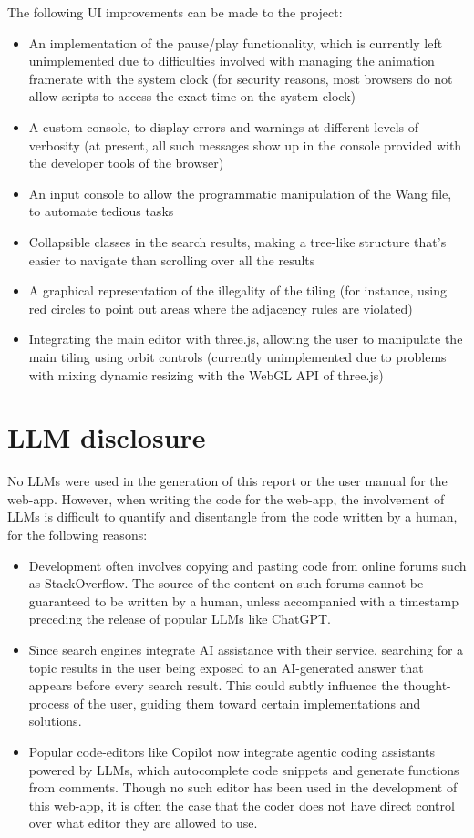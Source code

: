 \documentclass[letterpaper,11pt]{article}
\begin{document}
The following UI improvements can be made to the project:

\begin{itemize}
	\item An implementation of the pause/play functionality, which is currently left unimplemented due to difficulties involved with managing the animation framerate with the system clock (for security reasons, most browsers do not allow scripts to access the exact time on the system clock)
	\item A custom console, to display errors and warnings at different levels of verbosity (at present, all such messages show up in the console provided with the developer tools of the browser)
	\item An input console to allow the programmatic manipulation of the Wang file, to automate tedious tasks
	\item Collapsible classes in the search results, making a tree-like structure that's easier to navigate than scrolling over all the results
	\item A graphical representation of the illegality of the tiling (for instance, using red circles to point out areas where the adjacency rules are violated)
	\item Integrating the main editor with three.js, allowing the user to manipulate the main tiling using orbit controls (currently unimplemented due to problems with mixing dynamic resizing with the WebGL API of three.js)
\end{itemize}

\section*{LLM disclosure}

No LLMs were used in the generation of this report or the user manual for the web-app. However, when writing the code for the web-app, the involvement of LLMs is difficult to quantify and disentangle from the code written by a human, for the following reasons:

\begin{itemize}
	\item Development often involves copying and pasting code from online forums such as StackOverflow. The source of the content on such forums cannot be guaranteed to be written by a human, unless accompanied with a timestamp preceding the release of popular LLMs like ChatGPT.
	\item Since search engines integrate AI assistance with their service, searching for a topic results in the user being exposed to an AI-generated answer that appears before every search result. This could subtly influence the thought-process of the user, guiding them toward certain implementations and solutions.
	\item Popular code-editors like Copilot now integrate agentic coding assistants powered by LLMs, which autocomplete code snippets and generate functions from comments. Though no such editor has been used in the development of this web-app, it is often the case that the coder does not have direct control over what editor they are allowed to use.
\end{itemize}
\end{document}
